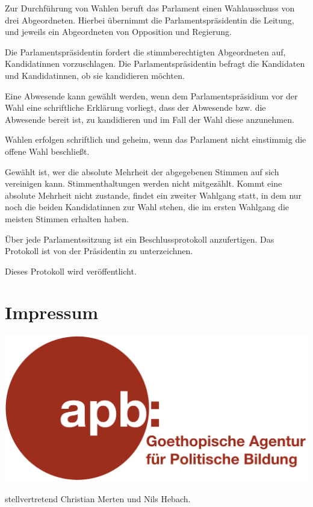\documentclass{sasbase}
\begin{document}
\begin{article}[Wahl]
\item Zur Durchführung von Wahlen beruft das Parlament einen Wahlausschuss von drei Abgeordneten. Hierbei \"{u}bernimmt die Parlamentspr\"{a}sidentin die Leitung, und jeweils ein Abgeordneten von Opposition und Regierung.
\item Die Parlamentspr\"{a}sidentin fordert die stimmberechtigten Abgeordneten auf, Kandidatinnen vorzuschlagen. Die Parlamentspr\"{a}sidentin befragt die Kandidaten und Kandidatinnen, ob sie kandidieren möchten.
\item Eine Abwesende kann gewählt werden, wenn dem Parlamentspr\"{a}sidium vor der Wahl eine schriftliche Erklärung vorliegt, dass der Abwesende bzw. die Abwesende bereit ist, zu kandidieren und im Fall der Wahl diese anzunehmen.
\item Wahlen erfolgen schriftlich und geheim, wenn das Parlament nicht einstimmig die offene Wahl beschließt.
\item Gewählt ist, wer die absolute Mehrheit der abgegebenen Stimmen auf sich vereinigen kann. Stimmenthaltungen werden nicht mitgezählt. Kommt eine absolute Mehrheit nicht zustande, findet ein zweiter Wahlgang statt, in dem nur noch die beiden Kandidatinnen zur Wahl stehen, die im ersten Wahlgang die meisten Stimmen erhalten haben.
\end{article}
\begin{article}[Protokoll]
\item Über jede Parlamentssitzung ist ein Beschlussprotokoll anzufertigen. Das Protokoll ist von der Pr\"{a}sidentin zu unterzeichnen.
\item Dieses Protokoll wird ver\"{o}ffentlicht.	
\end{article}
\section{Impressum}
\begin{minipage}{0.4\linewidth}
\includegraphics[width=\textwidth]{apb_icon.png}
\end{minipage}
\begin{minipage}{0.5\linewidth}
{\raggedright stellvertretend Christian Merten und Nils Hebach.}
\end{minipage}
\end{document}
